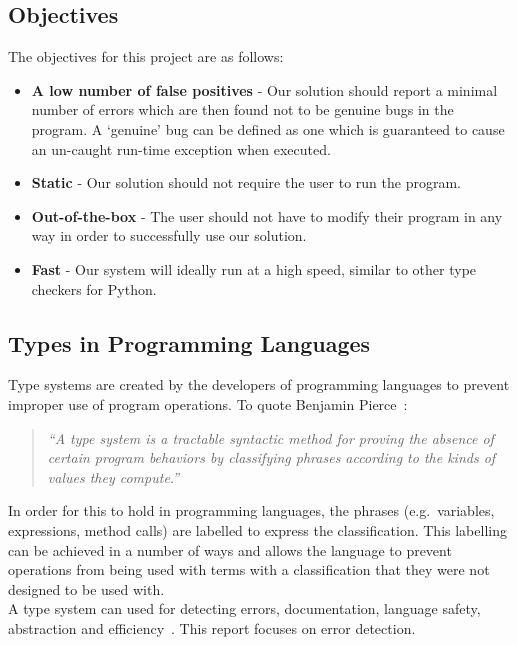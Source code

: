 \documentclass[12pt, titlepage]{article}
\begin{document}
\subsection{Objectives}
The objectives for this project are as follows:
\begin{itemize}
	\item \textbf{A low number of false positives} - Our solution should report a minimal number of errors which are then found not to be genuine bugs in the program. A `genuine' bug can be defined as one which is guaranteed to cause an un-caught run-time exception when executed.
	\item \textbf{Static} - Our solution should not require the user to run the program.
	\item \textbf{Out-of-the-box} - The user should not have to modify their program in any way in order to successfully use our solution.
	\item \textbf{Fast} - Our system will ideally run at a high speed, similar to other type checkers for Python.
\end{itemize} 

\subsection{Types in Programming Languages}
Type systems are created by the developers of programming languages to prevent improper use of program operations. To quote Benjamin Pierce~\cite{pierce02}:
\begin{quote}
	\emph{``A type system is a tractable syntactic method for proving the absence of certain program behaviors by classifying phrases according to the kinds of values they compute.''}
\end{quote}
In order for this to hold in programming languages, the phrases (e.g.\ variables, expressions, method calls) are labelled to express the classification. This labelling can be achieved in a number of ways and allows the language to prevent operations from being used with terms with a classification that they were not designed to be used with. \\
\indent A type system can used for detecting errors, documentation, language safety, abstraction and efficiency~\cite{pierce02}. This report focuses on error detection.
\end{document}
